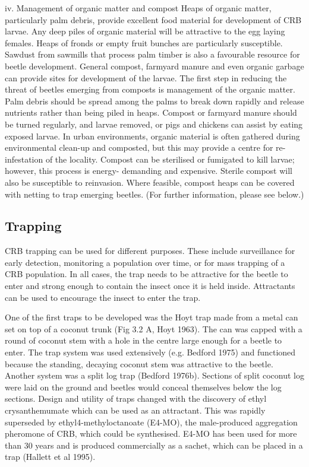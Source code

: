 \documentclass[twocolumn,letterpaper]{scrartcl}
\begin{document}
iv.  Management of organic matter and compost
Heaps  of  organic  matter,  particularly  palm  debris,  provide  excellent  food  material  for  development  of  CRB 
larvae. Any deep piles of organic material will be attractive to the egg laying females. Heaps of fronds or empty 
fruit bunches are particularly susceptible. Sawdust from sawmills that process palm timber is also a favourable 
resource for beetle development. General compost, farmyard manure and even organic garbage can provide 
sites for development of the larvae. The first step in reducing the threat of beetles emerging from composts is 
management of the organic matter. Palm debris should be spread among the palms to break down rapidly and 
release nutrients rather than being piled in heaps. Compost or farmyard manure should be turned regularly, 
and larvae removed, or pigs and chickens can assist by eating exposed larvae. In urban environments, organic 
material is often gathered during environmental clean-up and composted, but this may provide a centre for re-
infestation of the locality. Compost can be sterilised or fumigated to kill larvae; however, this process is energy-
demanding  and  expensive.  Sterile  compost  will  also  be  susceptible  to  reinvasion.  Where  feasible,  compost 
heaps can be covered with netting to trap emerging beetles. (For further information, please see below.) 

\subsection{Trapping}

CRB trapping can be used for different purposes. These include surveillance for early detection, monitoring a 
population over time, or for mass trapping of a CRB population. In all cases, the trap needs to be attractive for 
the beetle to enter and strong enough to contain the insect once it is held inside. Attractants can be used to 
encourage the insect to enter the trap. 

One of the first traps to be developed was the Hoyt trap made from a metal can set on top of a coconut trunk 
(Fig 3.2 A, Hoyt 1963). The can was capped with a round of coconut stem with a hole in the centre large enough 
for a beetle to enter. The trap system was used extensively (e.g. Bedford 1975) and functioned because the 
standing, decaying coconut stem was attractive to the beetle. Another system was a split log trap (Bedford 
1976b). Sections of split coconut log were laid on the ground and beetles would conceal themselves below the 
log sections. Design and utility of traps changed with the discovery of ethyl crysanthemumate which can be 
used as an attractant. This was rapidly superseded by ethyl4-methyloctanoate (E4-MO), the male-produced 
aggregation pheromone of CRB, which could be synthesised. E4-MO has been used for more than 30 years and 
is produced commercially as a sachet, which can be placed in a trap (Hallett et al 1995). 
\end{document}
